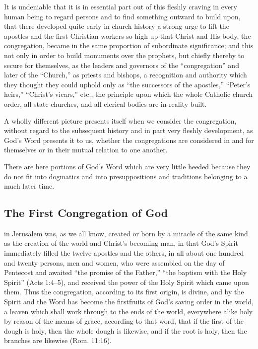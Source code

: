 It is undeniable that it is in essential part out of this fleshly craving in every human being to regard persons and to find something outward to build upon, that there developed quite early in church history a strong urge to lift the apostles and the first Christian workers so high up that Christ and His body, the congregation, became in the same proportion of subordinate significance; and this not only in order to build monuments over the prophets, but chiefly thereby to secure for themselves, as the leaders and governors of the “congregation” and later of the “Church,” as priests and bishops, a recognition and authority which they thought they could uphold only as “the successors of the apostles,” “Peter’s heirs,” “Christ’s vicars,” etc., the principle upon which the whole Catholic church order, all state churches, and all clerical bodies are in reality built.

A wholly different picture presents itself when we consider the congregation, without regard to the subsequent history and in part very fleshly development, as God’s Word presents it to us, whether the congregations are considered in and for themselves or in their mutual relation to one another.

There are here portions of God’s Word which are very little heeded because they do not fit into dogmatics and into presuppositions and traditions belonging to a much later time.

\subsection{The First Congregation of God}

in Jerusalem was, as we all know, created or born by a miracle of the same kind as the creation of the world and Christ’s becoming man, in that God’s Spirit immediately filled the twelve apostles and the others, in all about one hundred and twenty persons, men and women, who were assembled on the day of Pentecost and awaited “the promise of the Father,” “the baptism with the Holy Spirit” (Acts 1:4–5), and received the power of the Holy Spirit which came upon them. Thus the congregation, according to its first origin, is divine, and by the Spirit and the Word has become the firstfruits of God’s saving order in the world, a leaven which shall work through to the ends of the world, everywhere alike holy by reason of the means of grace, according to that word, that if the first of the dough is holy, then the whole dough is likewise, and if the root is holy, then the branches are likewise (Rom. 11:16).

